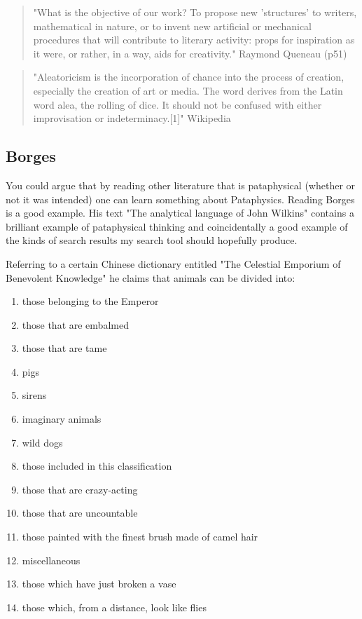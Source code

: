 \begin{quote}
  "What is the objective of our work? To propose new 'structures' to writers, mathematical in nature, or to invent new artificial or mechanical procedures that will contribute to literary activity: props for inspiration as it were, or rather, in a way, aids for creativity." Raymond Queneau (p51)
\end{quote}

\begin{quote}
  "Aleatoricism is the incorporation of chance into the process of creation, especially the creation of art or media. The word derives from the Latin word alea, the rolling of dice. It should not be confused with either improvisation or indeterminacy.[1]" Wikipedia
\end{quote}

\subsection{Borges}

You could argue that by reading other literature that is pataphysical (whether or not it was intended) one can learn something about Pataphysics. Reading Borges \citep{Borges1964, Borges2004, Borges1957, Borges2010a, Borges2010b, Borges2000} is a good example. His text "The analytical language of John Wilkins" \citep{Borges2000} contains a brilliant example of pataphysical thinking and coincidentally a good example of the kinds of search results my search tool should hopefully produce.

Referring to a certain Chinese dictionary entitled "The Celestial Emporium of Benevolent Knowledge" he claims that animals can be divided into:

\begin{enumerate}
  \item	those belonging to the Emperor
  \item	those that are embalmed
  \item	those that are tame
  \item	pigs
  \item	sirens
  \item	imaginary animals
  \item	wild dogs
  \item	those included in this classification
  \item	those that are crazy-acting
  \item	those that are uncountable
  \item	those painted with the finest brush made of camel hair
  \item	miscellaneous
  \item	those which have just broken a vase
  \item	those which, from a distance, look like flies
\end{enumerate}

